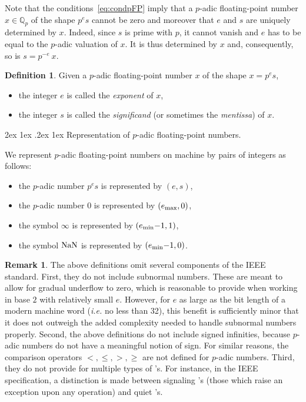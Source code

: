\documentclass[11pt]{article}
\makeatletter
\numberwithin{equation}{section}
\numberwithin{figure}{section}
\renewcommand\paragraph{\@startsection{paragraph}{4}{\z@}%
                                    {2ex \@plus1ex \@minus.2ex}%
                                    {1ex}%
                                    {\normalfont\normalsize\bfseries}}
\renewcommand{\leq}{\leqslant}
\renewcommand{\geq}{\geqslant}
\theoremstyle{definition}
\newtheorem{deftn}[theo]{Definition}
\newtheorem{rem}[theo]{Remark}
\newcommand{\Q}{\mathbb Q}
\newcommand{\Qp}{\Q_p}
\renewcommand{\min}{\text{\rm min}}
\renewcommand{\max}{\text{\rm max}}
\newcommand{\nan}{\text{\rm NaN}}
\makeatother
\begin{document}
\noindent
Note that the conditions~\eqref{eq:condpFP} imply that a $p$-adic 
floating-point number $x \in \Qp$ of the shape $p^e s$ cannot be zero
and moreover that $e$ and $s$ are uniquely determined by $x$. Indeed, 
since $s$ is prime with $p$, it cannot vanish and $e$ has to be equal
to the $p$-adic valuation of $x$. It is thus determined by $x$ and,
consequently, so is $s = p^{-e} \: x$.

\begin{deftn}
Given a $p$-adic floating-point number $x$ of the shape $x = p^e s$,
\begin{itemize}
\renewcommand{\itemsep}{0pt}
\item the integer $e$ is called the \emph{exponent} of $x$, 
\item the integer $s$ is called the \emph{significand} (or sometimes
the \emph{mentissa}) of $x$.
\end{itemize}
\end{deftn}

\paragraph{Representation of $p$-adic floating-point numbers.}

We represent $p$-adic floating-point numbers on machine by pairs
of integers as follows:
\begin{itemize}
\renewcommand{\itemsep}{0pt}
\item the $p$-adic number $p^e s$ is represented by $(e,s)$,
\item the $p$-adic number $0$ is represented by $(e_\max,0)$,
\item the symbol $\infty$ is represented by $(e_\min{-}1, 1)$,
\item the symbol $\nan$ is represented by $(e_\min{-}1, 0)$.
\end{itemize}

\begin{rem}
The above definitions omit several components of the IEEE 
standard. First, they do not include subnormal numbers. These are 
meant to allow for gradual underflow to zero, which is reasonable to 
provide when working in base $2$ with relatively small $e$. However, for 
$e$ as large as the bit length of a modern machine word (\emph{i.e.} no 
less than 32), this benefit is sufficiently minor that it does not 
outweigh the added complexity needed to handle subnormal numbers 
properly.
Second, the above definitions do not include signed infinities, because $p$-adic numbers 
do not have a meaningful notion of sign. For similar reasons, the comparison
operators $<, \leq, >, \geq$ are not defined for $p$-adic numbers.
Third, they do not provide for multiple types of \nan's. For instance, in 
the IEEE specification, a distinction is made between signaling \nan's 
(those which raise an exception upon any operation) and quiet \nan's.
\end{rem}
\end{document}
